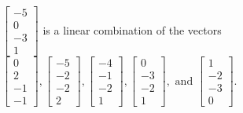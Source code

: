 \begin{exercise}
\begin{exerciseStatement}
  \end{exerciseStatement}
  \begin{exerciseAnswer}
   \(\left[\begin{array}{c}
-5 \\
0 \\
-3 \\
1
\end{array}\right]\) 
  	 is  
	a linear combination of the vectors \(\left[\begin{array}{c}
0 \\
2 \\
-1 \\
-1
\end{array}\right] , \left[\begin{array}{c}
-5 \\
-2 \\
-2 \\
2
\end{array}\right] , \left[\begin{array}{c}
-4 \\
-1 \\
-2 \\
1
\end{array}\right] , \left[\begin{array}{c}
0 \\
-3 \\
-2 \\
1
\end{array}\right] , \text{ and } \left[\begin{array}{c}
1 \\
-2 \\
-3 \\
0
\end{array}\right]\).

	
  


  \end{exerciseAnswer}
\end{exercise}